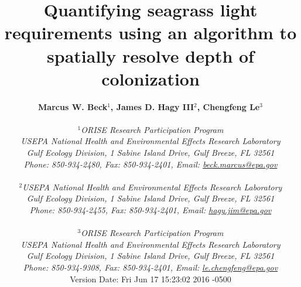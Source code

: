 \documentclass[letterpaper,12pt,oneside]{article}\usepackage[]{graphicx}\usepackage[]{color}
\begin{document}
\raggedbottom
\linenumbers
\raggedright
{}
\setlength{\parindent}{0.5in}
\renewcommand\refname{References \vspace{12pt}}

\begin{singlespace}
\title{{\bf {\Large Quantifying seagrass light requirements using an algorithm to spatially resolve depth of colonization}}}
\author{
  {\bf {\normalsize Marcus W. Beck$^1$, James D. Hagy III$^2$, Chengfeng Le$^3$}}
  \\\\{\textit {\normalsize $^1$ORISE Research Participation Program}}
  \\{\textit {\normalsize USEPA National Health and Environmental Effects Research Laboratory}}
  \\{\textit {\normalsize Gulf Ecology Division, 1 Sabine Island Drive, Gulf Breeze, FL 32561}}
	\\{\textit {\normalsize Phone: 850-934-2480, Fax: 850-934-2401, Email: \href{mailto:beck.marcus@epa.gov}{beck.marcus@epa.gov}}}
  \\\\{\textit {\normalsize $^2$USEPA National Health and Environmental Effects Research Laboratory}}
	\\{\textit {\normalsize Gulf Ecology Division, 1 Sabine Island Drive, Gulf Breeze, FL 32561}}
	\\{\textit {\normalsize Phone: 850-934-2455, Fax: 850-934-2401, Email: \href{mailto:hagy.jim@epa.gov}{hagy.jim@epa.gov}}}
  \\\\{\textit {\normalsize $^3$ORISE Research Participation Program}}
  \\{\textit {\normalsize USEPA National Health and Environmental Effects Research Laboratory}}
  \\{\textit {\normalsize Gulf Ecology Division, 1 Sabine Island Drive, Gulf Breeze, FL 32561}}
  \\{\textit {\normalsize Phone: 850-934-9308, Fax: 850-934-2401, Email: \href{mailto:le.chengfeng@epa.gov}{le.chengfeng@epa.gov}}}
  \vspace{1in} 
  \\ Version Date:   Fri Jun 17 15:23:02 2016 -0500
	}
\date{}
\maketitle
\end{singlespace}
\clearpage
\end{document}
